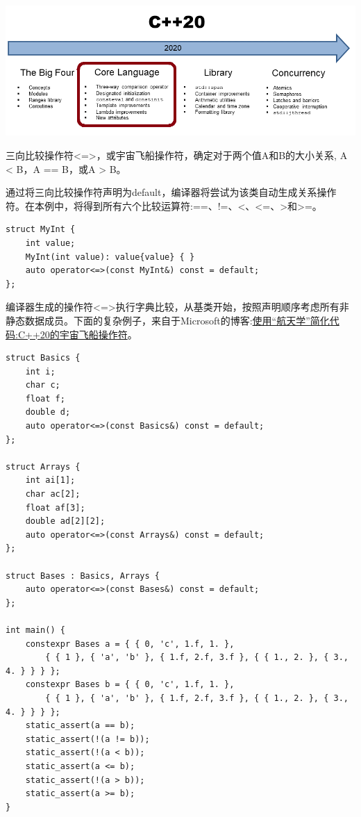 

\begin{center}
\includegraphics[width=1.0\textwidth]{content/2/chapter3/images/4.png}\\
\end{center}


三向比较操作符<=>，或宇宙飞船操作符，确定对于两个值A和B的大小关系, A < B，A == B，或A > B。

通过将三向比较操作符声明为default，编译器将尝试为该类自动生成关系操作符。在本例中，将得到所有六个比较运算符:==、!=、<、<=、>和>=。

\begin{lstlisting}[style=styleCXX]
struct MyInt {
	int value;
	MyInt(int value): value{value} { }
	auto operator<=>(const MyInt&) const = default;
};
\end{lstlisting}

编译器生成的操作符<=>执行字典比较，从基类开始，按照声明顺序考虑所有非静态数据成员。下面的复杂例子，来自于Microsoft的博客:\href{https://devblogs.microsoft.com/cppblog/simplify-your-code-with-rocket-science-c20s-spaceship-operator/}{使用“航天学”简化代码:C++20的宇宙飞船操作符}。


\begin{lstlisting}[style=styleCXX]
struct Basics {
	int i;
	char c;
	float f;
	double d;
	auto operator<=>(const Basics&) const = default;
};

struct Arrays {
	int ai[1];
	char ac[2];
	float af[3];
	double ad[2][2];
	auto operator<=>(const Arrays&) const = default;
};

struct Bases : Basics, Arrays {
	auto operator<=>(const Bases&) const = default;
};

int main() {
	constexpr Bases a = { { 0, 'c', 1.f, 1. },
		{ { 1 }, { 'a', 'b' }, { 1.f, 2.f, 3.f }, { { 1., 2. }, { 3., 4. } } } };
	constexpr Bases b = { { 0, 'c', 1.f, 1. },
		{ { 1 }, { 'a', 'b' }, { 1.f, 2.f, 3.f }, { { 1., 2. }, { 3., 4. } } } };
	static_assert(a == b);
	static_assert(!(a != b));
	static_assert(!(a < b));
	static_assert(a <= b);
	static_assert(!(a > b));
	static_assert(a >= b);
}
\end{lstlisting}

